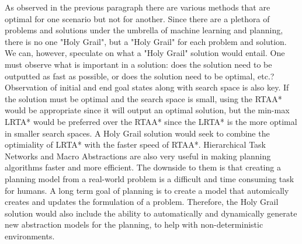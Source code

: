 \documentclass[tog]{acmsiggraph}
\begin{document}
\indent As observed in the previous paragraph there are various methods that are optimal for one scenario but not for another. Since there are a plethora of problems and solutions under the umbrella of machine learning and planning, there is no one "Holy Grail", but a "Holy Grail" for each problem and solution. We can, however, speculate on what a "Holy Grail" solution would entail. One must observe what is important in a solution: does the solution need to be outputted as fast as possible, or does the solution need to be optimal, etc.? Observation of initial and end goal states along with search space is also key. If the solution must be optimal and the search space is small, using the RTAA* would be appropriate since it will output an optimal solution, but the min-max LRTA* would be preferred over the RTAA* since the LRTA* is the more optimal in smaller search spaces. A Holy Grail solution would seek to combine the optimiality of LRTA* with the faster speed of RTAA*. Hierarchical Task Networks and Macro Abstractions are also very useful in making planning algorithms faster and more efficient. The downside to them is that creating a planning model from a real-world problem is a difficult and time consuming task for humans. A long term goal of planning is to create a model that automically creates and updates the formulation of a problem. Therefore, the Holy Grail solution would also include the ability to automatically and dynamically generate new abstraction models for the planning, to help with non-deterministic environments.
\end{document}
